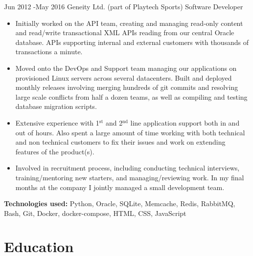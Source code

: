 \documentclass[10pt]{article} %
\begin{document}
\jobheader
{Jun 2012 -}{May 2016}
{Geneity Ltd. (part of Playtech Sports)}
{Software Developer}
\vspace{-1cm}
  \begin{itemize}

  \item Initially worked on the API team, creating and managing read-only content
        and read/write transactional XML APIs reading from our central Oracle database.
        APIs supporting internal and external customers with thousands of transactions
        a minute.

  \item Moved onto the DevOps and Support team managing our applications on
        provisioned Linux servers across several datacenters. Built and deployed
        monthly releases involving merging hundreds of git commits and resolving
        large scale conflicts from half a dozen teams, as well as compiling and
        testing database migration scripts.

  \item Extensive experience with 1$^{\textrm{st}}$ and 2$^{\textrm{nd}}$ line application
        support both in and out of hours. Also spent a large amount of time working
        with both technical and non technical customers to fix their issues and
        work on extending features of the product(s).

  \item Involved in recruitment process, including conducting technical interviews,
        training/mentoring new starters, and managing/reviewing work. In my final
        months at the company I jointly managed a small development team.

  \end{itemize}

  \textbf{Technologies used:}
  Python,
  Oracle, SQLite,
  Memcache, Redis,
  RabbitMQ,
  Bash,
  Git,
  Docker, docker-compose,
  HTML, CSS, JavaScript


\section{Education}

\end{document}
